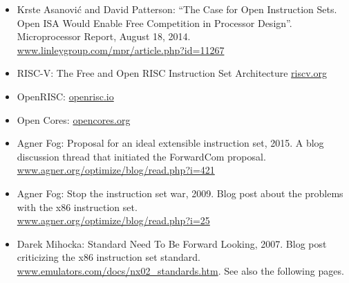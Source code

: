 \documentclass[forwardcom.tex]{subfiles}
\begin{document}
\begin{itemize}
\item
Krste Asanovi\'{c} and David Patterson: ``The Case for Open Instruction Sets. Open ISA Would Enable Free 
Competition in Processor Design''. Microprocessor Report, August 18, 2014. \\
\href{http://www.linleygroup.com/mpr/article.php?id=11267}{www.linleygroup.com/mpr/article.php?id=11267}

\item
RISC-V: The Free and Open RISC Instruction Set Architecture
\href{http://riscv.org}{riscv.org}

\item
OpenRISC: 
\href{http://openrisc.io}{openrisc.io}

\item
Open Cores: 
\href{http://opencores.org}{opencores.org}

\item
Agner Fog: Proposal for an ideal extensible instruction set, 2015. A blog discussion thread that initiated the ForwardCom proposal. \\
\href{http://www.agner.org/optimize/blog/read.php?i=421}{www.agner.org/optimize/blog/read.php?i=421}

\item
Agner Fog: Stop the instruction set war, 2009. Blog post about the problems with the x86 instruction set. \\
\href{http://www.agner.org/optimize/blog/read.php?i=25}{www.agner.org/optimize/blog/read.php?i=25}

\item
Darek Mihocka: Standard Need To Be Forward Looking, 2007. Blog post criticizing the x86 instruction set standard. \\
\href{http://www.emulators.com/docs/nx02_standards.htm}{www.emulators.com/docs/nx02\_standards.htm}.
See also the following pages.
\end{itemize}
\end{document}
